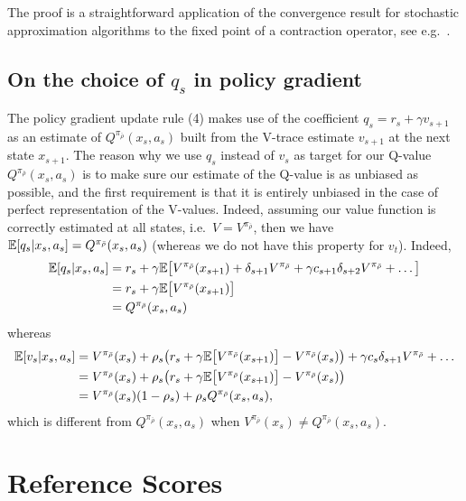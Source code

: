 The proof is a straightforward application of the convergence result for stochastic approximation algorithms to the fixed point of a contraction operator, see e.g.~\cite{Dayan94,bertsekas1996neurodynamic,kushner2003}.

\subsection{On the choice of $q_s$ in policy gradient}
The policy gradient update rule (4) %
makes use of the coefficient $q_s = r_s + \gamma v_{s+1}$ as an estimate of  $Q^{\pi_{\bar \rho}}(x_s, a_s)$ built from the V-trace estimate $v_{s+1}$ at the next state $x_{s+1}$. The reason why we use $q_s$ instead of $v_s$ as target for our Q-value $Q^{\pi_{\bar \rho}}(x_s,a_s)$ is to make sure our estimate of the Q-value is as unbiased as possible, and the first requirement is that it is entirely unbiased in the case of perfect representation of the V-values. Indeed, assuming our value function is correctly estimated at all states, i.e.~$V=V^{\pi_{\bar \rho}}$, then we have $\mathbb{E} [q_s|x_s,a_s] = Q^{\pi_{\bar \rho}}(x_{s},a_s)$ (whereas we do not have this property for $v_t$). Indeed,
\begin{align*}
\mathbb{E} [q_s|x_s,a_s] &= r_s + \gamma \mathbb{E}\big[ V^{\pi_{\bar \rho}}(x_{s+1}) + \delta_{s+1} V^{\pi_{\bar \rho}} 
 + \gamma c_{s+1} \delta_{s+2} V^{\pi_{\bar \rho}} + \dots \big]\\
&= r_s + \gamma \mathbb{E} \big[ V^{\pi_{\bar \rho}}(x_{s+1}) \big] \\
&= Q^{\pi_{\bar \rho}}(x_{s},a_s)
\end{align*}
whereas 
\begin{align*}
\mathbb{E} [v_s|x_s,a_s] &= V^{\pi_{\bar \rho}}(x_s) + \rho_s\big( r_s+\gamma \mathbb{E}\big[V^{\pi_{\bar \rho}}(x_{s+1})\big] 
- V^{\pi_{\bar \rho}}(x_s)\big) + \gamma c_{s} \delta_{s+1} V^{\pi_{\bar \rho}} + \dots \\
&= V^{\pi_{\bar \rho}}(x_s) + \rho_s\big( r_s+\gamma \mathbb{E}\big[V^{\pi_{\bar \rho}}(x_{s+1})\big] - V^{\pi_{\bar \rho}}(x_s)\big)\\
&= V^{\pi_{\bar \rho}}(x_s)(1-\rho_s) + \rho_s Q^{\pi_{\bar \rho}}(x_s,a_s),
\end{align*}
which is different from $Q^{\pi_{\bar \rho}}(x_s,a_s)$ when $V^{\pi_{\bar \rho}}(x_s)\neq Q^{\pi_{\bar \rho}}(x_s,a_s)$.

\vfill

\section{Reference Scores}
\label{sec:ref_scores}

